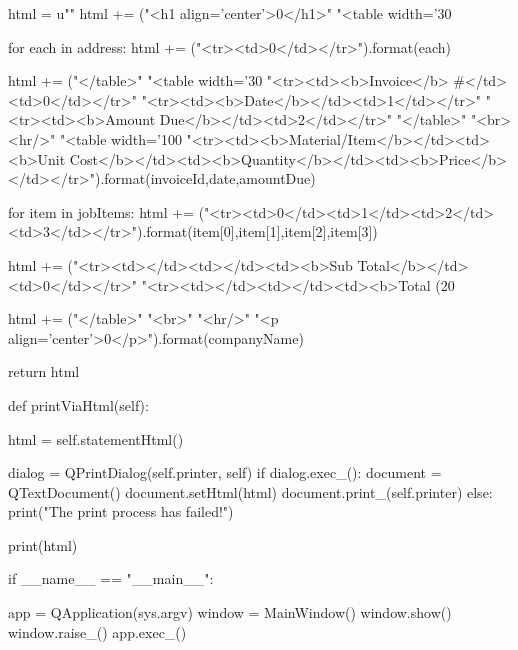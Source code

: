 \begin{python}
            
            
        
        html = u""
        html += ("<h1 align='center'>{0}</h1>"
                 "<table width='30%

        for each in address:
            html += ("<tr><td>{0}</td></tr>").format(each)


        html += ("</table>"
                 "<table width='30%
                 "<tr><td><b>Invoice</b> #</td><td>{0}</td></tr>"
                 "<tr><td><b>Date</b></td><td>{1}</td></tr>"
                 "<tr><td><b>Amount Due</b></td><td>{2}</td></tr>"
                 "</table>"
                 "<br><hr/>"
                 "<table width='100%
                 "<tr><td><b>Material/Item</b></td><td><b>Unit Cost</b></td><td><b>Quantity</b></td><td><b>Price</b></td></tr>").format(invoiceId,date,amountDue)

        for item in jobItems:
            html += ("<tr><td>{0}</td><td>{1}</td><td>{2}</td><td>{3}</td></tr>").format(item[0],item[1],item[2],item[3])

        html += ("<tr><td></td><td></td><td><b>Sub Total</b></td><td>{0}</td></tr>"
                 "<tr><td></td><td></td><td><b>Total (20%

        html += ("</table>"
                 "<br>"
                 "<hr/>"
                 "<p align='center'>{0}</p>").format(companyName)


        return html

        

    def printViaHtml(self):

        html = self.statementHtml()

        dialog = QPrintDialog(self.printer, self)
        if dialog.exec_():
            document = QTextDocument()
            document.setHtml(html)
            document.print_(self.printer)
        else:
            print("The print process has failed!")

        print(html)
        


if __name__ == "__main__":

    app = QApplication(sys.argv)
    window = MainWindow()
    window.show()
    window.raise_()
    app.exec_()


\end{python}


